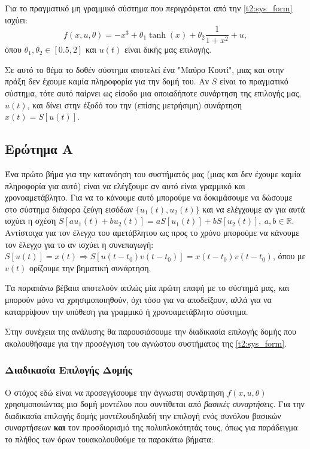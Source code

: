 \documentclass[12pt]{article} %
\numberwithin{equation}{section}  %
\begin{document}
Για το πραγματικό μη γραμμικό σύστημα που περιγράφεται από την \eqref{t2:sys_form} ισχύει:
\begin{equation}\label{t2:f_true}
    f(x, u, \theta) = - x^3 + \theta_1 \tanh(x) + \theta_2 \frac{1}{1 + x^2} + u, 
\end{equation}
όπου $\theta_1, \theta_2 \in [0.5, 2]$ και $u(t)$ είναι δικής μας επιλογής. 

Σε αυτό το θέμα το δοθέν σύστημα αποτελεί ένα "Μαύρο Κουτί", μιας και στην πράξη δεν έχουμε καμία πληροφορία για την δομή του. 
Αν $S$ είναι το πραγματικό σύστημα, τότε αυτό παίρνει ως είσοδο μια οποιαδήποτε συνάρτηση της επιλογής μας, $u(t)$, 
και δίνει στην έξοδό του την (επίσης μετρήσιμη) συνάρτηση $x(t) = S[u(t)]$.


\subsection{Ερώτημα Α}
Ένα πρώτο βήμα για την κατανόηση του συστήματός μας (μιας και δεν έχουμε καμία πληροφορία για αυτό) 
είναι να ελέγξουμε αν αυτό είναι γραμμικό και χρονοαμετάβλητο.
Για να το κάνουμε αυτό μπορούμε να δοκιμάσουμε να δώσουμε στο σύστημα διάφορα ζεύγη εισόδων $\{u_1(t), u_2(t)\}$
και να ελέγχουμε αν για αυτά ισχύει η σχέση $S[au_1(t) + bu_2(t)] = aS[u_1(t)] + bS[u_2(t)],\ a,b \in \mathbb{R}$.
Αντίστοιχα για τον έλεγχο του αμετάβλητου ως προς το χρόνο μπορούμε να κάνουμε τον έλεγχο για το αν ισχύει η συνεπαγωγή: 
$S[u(t)] = x(t) \Rightarrow S[u(t - t_0)v(t-t_0)] = x(t-t_0)v(t-t_0)$, όπου με $v(t)$ ορίζουμε την βηματική συνάρτηση. 

Τα παραπάνω βέβαια αποτελούν απλώς μία πρώτη επαφή με το σύστημά μας, και μπορούν μόνο να χρησιμοποιηθούν, 
όχι τόσο για να αποδείξουν, αλλά για να 
καταρρίψουν την υπόθεση για γραμμικό ή χρονοαμετάβλητο σύστημα. 

Στην συνέχεια της ανάλυσης θα παρουσιάσουμε την διαδικασία επιλογής δομής που ακολουθήσαμε για την προσέγγιση του αγνώστου συστήματος της \eqref{t2:sys_form}.


\subsubsection{Διαδικασία Επιλογής Δομής}

Ο στόχος εδώ είναι να προσεγγίσουμε την άγνωστη συνάρτηση \(f(x, u, \theta)\) χρησιμοποιώντας μια δομή μοντέλου που συντίθεται από \textit{βασικές συναρτήσεις}. 
Για την διαδικασία επιλογής δομής μοντέλου\textemdash δηλαδή την επιλογή ενός συνόλου βασικών συναρτήσεων \textbf{και} τον προσδιορισμό της πολυπλοκότητάς τους, όπως για παράδειγμα το πλήθος των όρων του\textemdash ακολουθούμε τα παρακάτω βήματα:
\end{document}
